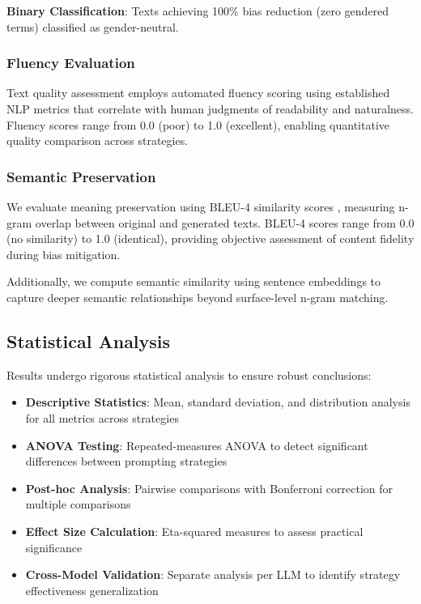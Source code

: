 \textbf{Binary Classification}: Texts achieving 100\% bias reduction (zero gendered terms) classified as gender-neutral.

\subsubsection{Fluency Evaluation}
Text quality assessment employs automated fluency scoring using established NLP metrics that correlate with human judgments of readability and naturalness. Fluency scores range from 0.0 (poor) to 1.0 (excellent), enabling quantitative quality comparison across strategies.

\subsubsection{Semantic Preservation}
We evaluate meaning preservation using BLEU-4 similarity scores \cite{papineni2002bleu}, measuring n-gram overlap between original and generated texts. BLEU-4 scores range from 0.0 (no similarity) to 1.0 (identical), providing objective assessment of content fidelity during bias mitigation.

Additionally, we compute semantic similarity using sentence embeddings to capture deeper semantic relationships beyond surface-level n-gram matching.

\subsection{Statistical Analysis}

Results undergo rigorous statistical analysis to ensure robust conclusions:

\begin{itemize}
    \item \textbf{Descriptive Statistics}: Mean, standard deviation, and distribution analysis for all metrics across strategies
    \item \textbf{ANOVA Testing}: Repeated-measures ANOVA to detect significant differences between prompting strategies
    \item \textbf{Post-hoc Analysis}: Pairwise comparisons with Bonferroni correction for multiple comparisons
    \item \textbf{Effect Size Calculation}: Eta-squared measures to assess practical significance
    \item \textbf{Cross-Model Validation}: Separate analysis per LLM to identify strategy effectiveness generalization
\end{itemize}

